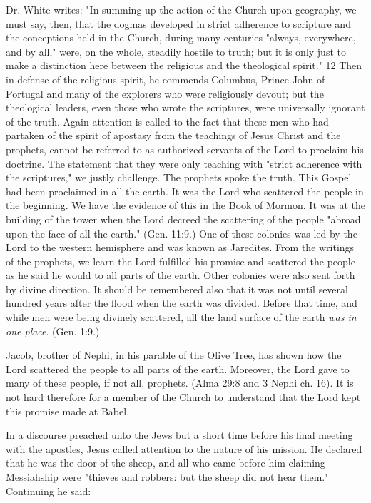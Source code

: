 Dr. White writes: "In summing up the action of the Church upon geography, we must say,
then, that the dogmas developed in strict adherence to scripture and the conceptions held in
the Church, during many centuries "always, everywhere, and by all," were, on the whole,
steadily hostile to truth; but it is only just to make a distinction here between the religious
and the theological spirit." 12 Then in defense of the religious spirit, he commends
Columbus, Prince John of Portugal and many of the explorers who were religiously devout;
but the theological leaders, even those who wrote the scriptures, were universally ignorant of
the truth. Again attention is called to the fact that these men who had partaken of the spirit of
apostasy from the teachings of Jesus Christ and the prophets, cannot be referred to as
authorized servants of the Lord to proclaim his doctrine. The statement that they were only
teaching with "strict adherence with the scriptures," we justly challenge. The prophets spoke
the truth. This Gospel had been proclaimed in all the earth. It was the Lord who scattered the
people in the beginning. We have the evidence of this in the Book of Mormon. It was at the
building of the tower when the Lord decreed the scattering of the people "abroad upon the
face of all the earth." (Gen. 11:9.) One of these colonies was led by the Lord to the western
hemisphere and was known as Jaredites. From the writings of the prophets, we learn the Lord
fulfilled his promise and scattered the people as he said he would to all parts of the earth.
Other colonies were also sent forth by divine direction. It should be remembered also that it
was not until several hundred years after the flood when the earth was divided. Before that
time, and while men were being divinely scattered, all the land surface of the earth \textit{was in
one place}. (Gen. 1:9.)

Jacob, brother of Nephi, in his parable of the Olive Tree, has shown how the Lord scattered
the people to all parts of the earth. Moreover, the Lord gave to many of these people, if not
all, prophets. (Alma 29:8 and 3 Nephi ch. 16). It is not hard therefore for a member of the
Church to understand that the Lord kept this promise made at Babel.

In a discourse preached unto the Jews but a short time before his final meeting with the
apostles, Jesus called attention to the nature of his mission. He declared that he was the door
of the sheep, and all who came before him claiming Messiahship were "thieves and robbers:
but the sheep did not hear them." Continuing he said:


